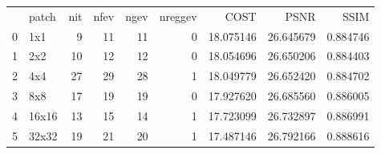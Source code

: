 \begin{tabular}{llrrrrrrr}
 & patch & nit & nfev & ngev & nreggev & COST & PSNR & SSIM \\
0 & 1x1 & 9 & 11 & 11 & 0 & 18.075146 & 26.645679 & 0.884746 \\
1 & 2x2 & 10 & 12 & 12 & 0 & 18.054696 & 26.650206 & 0.884403 \\
2 & 4x4 & 27 & 29 & 28 & 1 & 18.049779 & 26.652420 & 0.884702 \\
3 & 8x8 & 17 & 19 & 19 & 0 & 17.927620 & 26.685560 & 0.886005 \\
4 & 16x16 & 13 & 15 & 14 & 1 & 17.723099 & 26.732897 & 0.886991 \\
5 & 32x32 & 19 & 21 & 20 & 1 & 17.487146 & 26.792166 & 0.888616 \\
\end{tabular}

